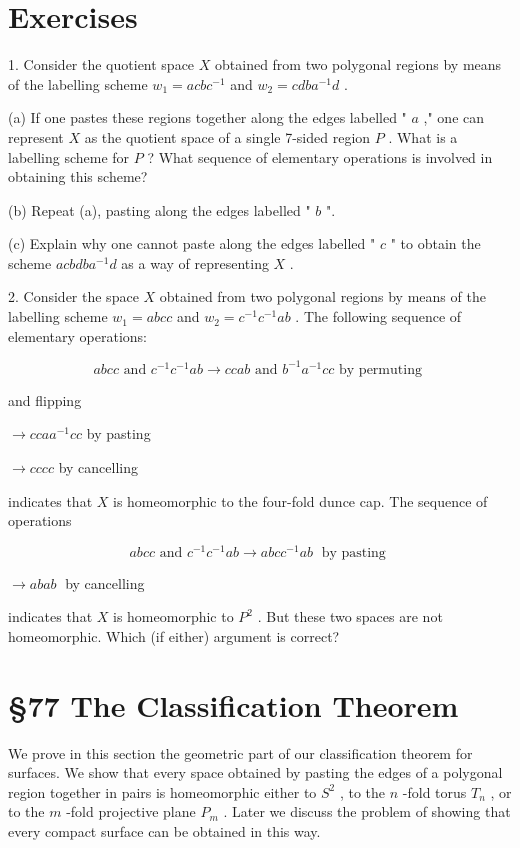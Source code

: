 \section*{Exercises}

1. Consider the quotient space \(X\) obtained from two polygonal regions by means of the labelling scheme \({w}_{1} = {acb}{c}^{-1}\) and \({w}_{2} = {cdb}{a}^{-1}d\) .

(a) If one pastes these regions together along the edges labelled " \(a\) ," one can represent \(X\) as the quotient space of a single 7-sided region \(P\) . What is a labelling scheme for \(P\) ? What sequence of elementary operations is involved in obtaining this scheme?

(b) Repeat (a), pasting along the edges labelled " \(b\) ".

(c) Explain why one cannot paste along the edges labelled " \(c\) " to obtain the scheme \({acbdb}{a}^{-1}d\) as a way of representing \(X\) .

2. Consider the space \(X\) obtained from two polygonal regions by means of the labelling scheme \({w}_{1} = {abcc}\) and \({w}_{2} = {c}^{-1}{c}^{-1}{ab}\) . The following sequence of elementary operations:

\[
{abcc}\text{ and }{c}^{-1}{c}^{-1}{ab} \rightarrow  {ccab}\text{ and }{b}^{-1}{a}^{-1}{cc}\text{ by permuting }
\]

and flipping

\(\rightarrow  c{caa}^{-1}{cc}\) by pasting

\(\rightarrow  {cccc}\) by cancelling

indicates that \(X\) is homeomorphic to the four-fold dunce cap. The sequence of operations

\[
{abcc}\text{ and }{c}^{-1}{c}^{-1}{ab} \rightarrow  {abc}{c}^{-1}{ab}\;\text{ by pasting }
\]

\(\rightarrow  {abab}\;\) by cancelling

indicates that \(X\) is homeomorphic to \({P}^{2}\) . But these two spaces are not homeomorphic. Which (if either) argument is correct?

\section*{ \S 77 The Classification Theorem}

We prove in this section the geometric part of our classification theorem for surfaces. We show that every space obtained by pasting the edges of a polygonal region together in pairs is homeomorphic either to \({S}^{2}\) , to the \(n\) -fold torus \({T}_{n}\) , or to the \(m\) -fold projective plane \({P}_{m}\) . Later we discuss the problem of showing that every compact surface can be obtained in this way.


